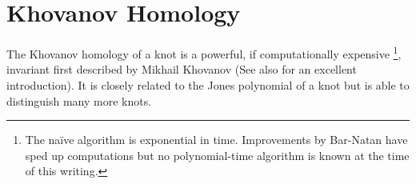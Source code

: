\documentclass{article}
\theoremstyle{plain}
\begin{document}
	\section{Khovanov Homology}
	    The Khovanov homology of a knot is a powerful, if computationally
	    expensive%
	    \footnote{The na\"{i}ve algorithm is exponential in time. Improvements
	    by Bar-Natan \cite{Khovanov1999CatJonesPoly} have sped up computations
	    but no polynomial-time algorithm is known at the time of this writing.},
	    invariant first described by Mikhail Khovanov
	    \cite{Khovanov1999CatJonesPoly} (See also \cite{barnatan2002khovanov}
	    for an excellent introduction). It is closely related to the Jones
	    polynomial of a knot but is able to distinguish many more knots.
    \newpage
    
    
    \newpage
\end{document}
